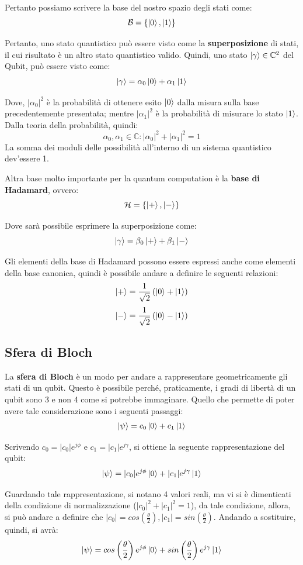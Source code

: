Pertanto possiamo scrivere la base del nostro spazio degli stati come:
\[
\mathcal{B} = \left\{ \ket{0}, \ket{1} \right\}
\]

Pertanto, uno stato quantistico può essere visto come la \textbf{superposizione} di stati, il cui risultato è un altro stato quantistico valido.
Quindi, uno stato \(\ket{\gamma} \in \mathbb{C}^2\) del Qubit, può essere visto come:
\[
\ket{\gamma} = \alpha_0 \ket{0} + \alpha_1 \ket{1}
\]

Dove, \(|\alpha_0|^2\) è la probabilità di ottenere esito \(\ket{0}\) dalla misura sulla base precedentemente presentata; mentre \(|\alpha_1|^2\) è la probabilità di misurare lo stato \(\ket{1}\). Dalla teoria della probabilità, quindi:
\[
\alpha_0, \alpha_1 \in \mathbb{C} : |\alpha_0|^2 + |\alpha_1|^2 = 1
\]
La somma dei moduli delle possibilità all'interno di un sistema quantistico dev'essere 1.

Altra base molto importante per la quantum computation è la \textbf{base di Hadamard}, ovvero:
\[
\mathcal{H} = \left\{ \ket{+},\ket{-}\right\}
\]

Dove sarà possibile esprimere la superposizione come:
\[
\ket{\gamma} = \beta_0 \ket{+} + \beta_1 \ket{-}
\]

Gli elementi della base di Hadamard possono essere espressi anche come elementi della base canonica, quindi è possibile andare a definire le seguenti relazioni:
\[
\ket{+} = \frac{1}{\sqrt{2}}\left(\ket{0} + \ket{1}\right)
\]
\[
\ket{-} = \frac{1}{\sqrt{2}}\left(\ket{0} - \ket{1}\right)
\]

\subsection{Sfera di Bloch}
La \textbf{sfera di Bloch} è un modo per andare a rappresentare geometricamente gli stati di un qubit.
Questo è possibile perché, praticamente, i gradi di libertà di un qubit sono 3 e non 4 come si potrebbe immaginare.
Quello che permette di poter avere tale considerazione sono i seguenti passaggi:
\[
\ket{\psi} = c_0 \ket{0} + c_1 \ket{1}
\]

Scrivendo \(c_0 = |c_0|e^{j\phi}\) e \(c_1 = |c_1|e^{j\gamma}\), si ottiene la seguente rappresentazione del qubit:
\[
\ket{\psi} = |c_0|e^{j\phi} \ket{0} + |c_1|e^{j\gamma} \ket{1}
\]

Guardando tale rappresentazione, si notano 4 valori reali, ma vi si è dimenticati della condizione di normalizzazione (\(|c_0|^2 + |c_1|^2 = 1\)), da tale condizione, allora, si può andare a definire che \(|c_0|=cos\left(\frac{\theta}{2}\right), |c_1| = sin\left(\frac{\theta}{2}\right)\). Andando a sostituire, quindi, si avrà:
\[
\ket{\psi} = cos\left(\frac{\theta}{2}\right) e^{j\phi} \ket{0} + sin\left(\frac{\theta}{2}\right) e^{j\gamma} \ket{1}
\]

